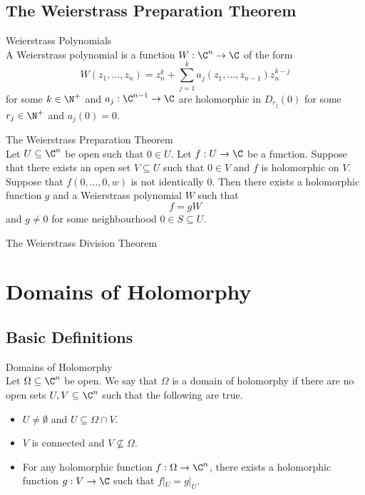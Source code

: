 \documentclass[a4paper]{article}
\begin{document}
\subsection{The Weierstrass Preparation Theorem}
\begin{defn}{Weierstrass Polynomials}{}\\
A Weierstrass polynomial is a function $W:\C^n\to\C$ of the form $$W(z_1,\dots,z_n)=z_n^k+\sum_{j=1}^ka_j(z_1,\dots,z_{n-1})z_n^{k-j}$$ for some $k\in\N^+$ and $a_j:\C^{n-1}\to\C$ are holomorphic in $D_{r_j}(0)$ for some $r_j\in\N^+$ and $a_j(0)=0$. 
\end{defn}

\begin{thm}{The Weierstrass Preparation Theorem}{}\\
Let $U\subseteq\C^n$ be open such that $0\in U$. Let $f:U\to\C$ be a function. Suppose that there exists an open set $V\subseteq U$ such that $0\in V$ and $f$ is holomorphic on $V$. Suppose that $f(0,\dots,0,w)$ is not identically $0$. Then there exists a holomorphic function $g$ and a Weierstrass polynomial $W$ such that $$f=gW$$ and $g\neq 0$ for some neighbourhood $0\in S\subseteq U$. 
\end{thm}

\begin{thm}{The Weierstrass Division Theorem}{}\\
\end{thm}


\pagebreak
\section{Domains of Holomorphy}
\subsection{Basic Definitions}
\begin{defn}{Domains of Holomorphy}{}\\
Let $\Omega\subseteq\C^n$ be open. We say that $\Omega$ is a domain of holomorphy if there are no open sets $U,V\subseteq\C^n$ such that the following are true. 
\begin{itemize}
\item $U\neq\emptyset$ and $U\subseteq\Omega\cap V$. 
\item $V$ is connected and $V\not\subseteq\Omega$. 
\item For any holomorphic function $f:\Omega\to\C^n$, there exists a holomorphic function $g:V\to\C$ such that $f|_U=g|_U$. 
\end{itemize} 
\end{defn}
\end{document}
